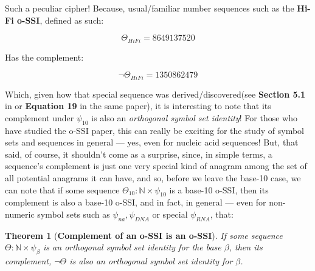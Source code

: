 \documentclass[a4paper, 18pt]{book} %
\newtheorem{theo}{Theorem}
\begin{document}
Such a peculiar cipher! Because, usual/familiar number sequences such as the \textbf{Hi-Fi o-SSI}\cite{adtpaper}, defined as such:

\vspace{1em}
\begin{equation}
\Theta_{HiFi} = 8 6 4 9 1 3 7 5 2 0
\end{equation}
\vspace{1em}

Has the complement:

\vspace{1em}
\begin{equation}
\lnot\Theta_{HiFi} = 1 3 5 0 8 6 2 4 7 9
\end{equation}
\vspace{1em}

Which, given how that special sequence was derived/discovered(see \textbf{Section 5.1} in \cite{ossipaper} or \textbf{Equation 19} in the same paper), it is interesting to note that its complement under $\psi_{10}$ is also an \textit{orthogonal symbol set identity}! For those who have studied the o-SSI paper\cite{ossipaper}, this can really be exciting for the study of symbol sets and sequences in general --- yes, even for nucleic acid sequences! But, that said, of course, it shouldn't come as a surprise, since, in simple terms, a sequence's complement is just one very special kind of anagram among the set of all potential anagrams it can have, and so, before we leave the base-10 case, we can note that if some sequence $\Theta_{10}: \mathbb{N} \times \psi_{10}$ is a base-10 o-SSI, then its complement is also a base-10 o-SSI, and in fact, in general --- even for non-numeric symbol sets such as $\psi_{na}, \psi_{DNA}$ or special $\psi_{RNA}$, that:

\vspace{2em}

\begin{theo}[\textbf{Complement of an o-SSI is an o-SSI}]
\label{THEOCOMPLOSSI}
If some sequence $\Theta: \mathbb{N} \times \psi_\beta$ is an orthogonal symbol set identity for the base $\beta$, then its complement, $\lnot\Theta$ is also an orthogonal symbol set identity for $\beta$.\\
\end{theo}

\vspace{2em}
\end{document}
